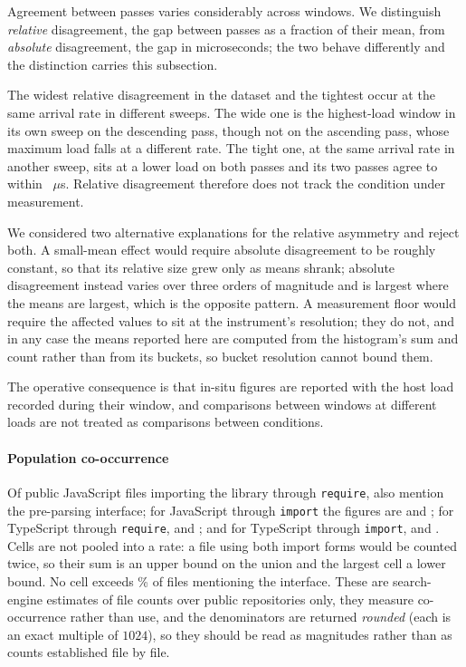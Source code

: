 \documentclass[preprint,12pt,authoryear]{elsarticle}
\begin{document}
Agreement between passes varies considerably across windows. We distinguish
\emph{relative} disagreement, the gap between passes as a fraction of their mean,
from \emph{absolute} disagreement, the gap in microseconds; the two behave
differently and the distinction carries this subsection.

The widest relative disagreement in the dataset and the tightest occur at the same
arrival rate in different sweeps. The wide one is the highest-load window in its
own sweep on the descending pass, though not on the ascending pass, whose maximum
load falls at a different rate. The tight one, at the same arrival rate in another
sweep, sits at a lower load on both passes and its two passes agree to within
\InsituTightestAgreement~$\mu$s. Relative disagreement therefore does not track
the condition under measurement.

We considered two alternative explanations for the relative asymmetry and reject
both. A small-mean effect would require absolute disagreement to be roughly
constant, so that its relative size grew only as means shrank; absolute
disagreement instead varies over three orders of magnitude and is largest where
the means are largest, which is the opposite pattern. A measurement floor would
require the affected values to sit at the instrument's resolution; they do not,
and in any case the means reported here are computed from the histogram's sum and
count rather than from its buckets, so bucket resolution cannot bound them.

The operative consequence is that in-situ figures are reported with the host load
recorded during their window, and comparisons between windows at different loads
are not treated as comparisons between conditions.

\paragraph{Population co-occurrence} Of \PopJsRequireFiles{} public JavaScript
files importing the library through \texttt{require},
\PopJsRequireFilesWithApi{} also mention the pre-parsing interface; for
JavaScript through \texttt{import} the figures are \PopJsImportFiles{} and
\PopJsImportFilesWithApi; for TypeScript through \texttt{require},
\PopTsRequireFiles{} and \PopTsRequireFilesWithApi; and for TypeScript through
\texttt{import}, \PopTsImportFiles{} and \PopTsImportFilesWithApi. Cells are not
pooled into a rate: a file using both import forms would be counted twice, so
their sum \PopSumFiles{} is an upper bound on the union and the largest cell
\PopLargestCellFiles{} a lower bound. No cell exceeds \PopWorstCellPct\% of files
mentioning the interface. These are search-engine estimates of file counts over
public repositories only, they measure co-occurrence rather than use, and the
denominators are returned \emph{rounded} (each is an exact multiple of $1024$), so they should be read as magnitudes rather than as counts established file
by file.
\end{document}
